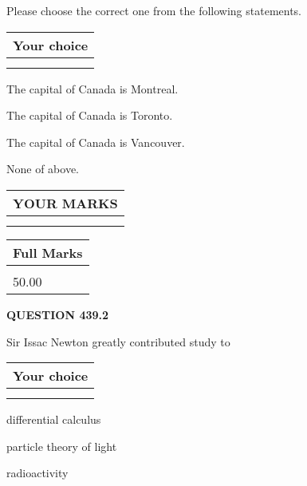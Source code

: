 \documentclass[12pt]{article}
\begin{document}
  
Please choose the correct one from the following statements.
  
  
\noindent\hspace{3.0in} \begin{tabular}{|l|}
\hline
Your choice \\
\hline
 \\ 
 \\ 
\hline
\end{tabular}
  
  
 
 
The capital of Canada is Montreal.
 
 
The capital of Canada is Toronto.
 
 
The capital of Canada is Vancouver.
 
 
 None of above.
 
 
  
\vspace{0.2in}
  
\noindent\begin{tabular}{|l|}
\hline
 YOUR MARKS  \\
\hline
 \\ 
 \\ 
\hline
\end{tabular}
\hspace{0.05in} \begin{tabular}{|l|}
\hline
 Full Marks  \\
\hline
 \\ 
50.00 \\
\hline
\end{tabular}
{\textbf{\Large{QUESTION
439.2 
}}}
  
  
Sir Issac Newton greatly contributed study to
  
  
\noindent\hspace{3.0in} \begin{tabular}{|l|}
\hline
Your choice \\
\hline
 \\ 
 \\ 
\hline
\end{tabular}
  
  
 
 
differential calculus
 
 
particle theory of light
 
 
radioactivity
 
\end{document}

